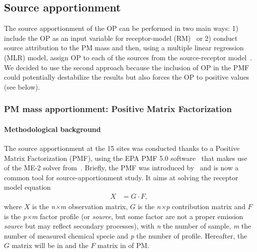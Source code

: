 \documentclass[acp]{copernicus}
\begin{document}
\subsection{Source apportionment}%
\label{source-apportionment}

The source apportionment of the OP can be performed in two main ways: 1)
include the OP as an input variable for receptor-model
(RM)~\citep{cesariSource2019,fangOxidative2016,maSources2018,vermaReactive2014}
or 2) conduct source attribution to the PM mass and then, using a multiple
linear regression (MLR) model, assign OP to each of the sources from the
source-receptor
model~\citep{batesReactive2015,cesariSource2019,paraskevopoulouYearlong2019,vermaOrganic2015,weberApportionment2018,zhouPredominance2019}.
We decided to use the second approach because the
inclusion of OP in the PMF could potentially destabilize the results but
also forces the OP to positive values (see below).

\subsubsection{PM mass apportionment: Positive Matrix Factorization}%
\label{pm-mass-apportionment-positive-matrix-factorization}

\paragraph{Methodological background}%
\label{methodological-background}

The source apportionment at the 15 sites was conducted thanks to a
Positive Matrix Factorization (PMF), using the EPA PMF 5.0
software~\citep{usepaPositive2017}
that makes use of the ME-2 solver from~\citet{paateroMultilinear1999}.
Briefly, the PMF was introduced by~\citet{paateroPositive1994} and is now
a common tool for source-apportionment study. It aims at solving the
receptor model equation
\begin{align}
    X &= G \cdot F,
\end{align}
where \(X\) is the \emph{n×m} observation matrix, \(G\) is the
\emph{n×p} contribution matrix and \(F\) is the \emph{p×m} factor
profile (or \emph{source}, but some factor are not a proper emission
\emph{source} but may reflect secondary processes), with \emph{n} the
number of sample, \emph{m} the number of measured chemical specie and
\emph{p} the number of profile. Hereafter, the \(G\) matrix will be in
and the \(F\) matrix in of PM.
\end{document}
